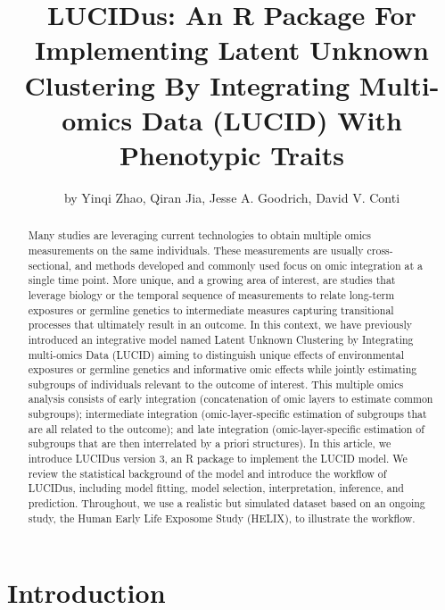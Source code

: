 
\title{LUCIDus: An R Package For Implementing Latent Unknown Clustering By Integrating Multi-omics Data (LUCID) With Phenotypic Traits}

\author{by Yinqi Zhao, Qiran Jia, Jesse A. Goodrich, David V. Conti}

\maketitle

\begin{abstract}
Many studies are leveraging current technologies to obtain multiple omics measurements on the same individuals. These measurements are usually cross-sectional, and methods developed and commonly used focus on omic integration at a single time point. More unique, and a growing area of interest, are studies that leverage biology or the temporal sequence of measurements to relate long-term exposures or germline genetics to intermediate measures capturing transitional processes that ultimately result in an outcome. In this context, we have previously introduced an integrative model named Latent Unknown Clustering by Integrating multi-omics Data (LUCID) aiming to distinguish unique effects of environmental exposures or germline genetics and informative omic effects while jointly estimating subgroups of individuals relevant to the outcome of interest. This multiple omics analysis consists of early integration (concatenation of omic layers to estimate common subgroups); intermediate integration (omic-layer-specific estimation of subgroups that are all related to the outcome); and late integration (omic-layer-specific estimation of subgroups that are then interrelated by a priori structures). In this article, we introduce LUCIDus version 3, an R package to implement the LUCID model. We review the statistical background of the model and introduce the workflow of LUCIDus, including model fitting, model selection, interpretation, inference, and prediction. Throughout, we use a realistic but simulated dataset based on an ongoing study, the Human Early Life Exposome Study (HELIX), to illustrate the workflow.
\end{abstract}


\section{Introduction} \label{sec1}

